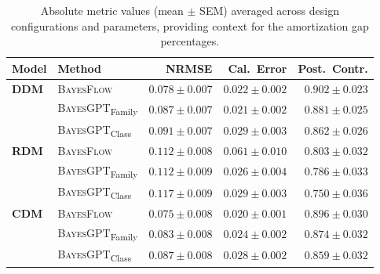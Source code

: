 \begin{table}[ht]
\centering
\small
\caption{Absolute metric values (mean $\pm$ SEM) averaged across design configurations and parameters, providing context for the amortization gap percentages.}
\label{tab:absolute-metrics}
\begin{tabular}{llrrr}
\toprule
\textbf{Model} & \textbf{Method} & NRMSE & Cal.\ Error & Post.\ Contr. \\
\midrule
\textbf{DDM} & \textsc{BayesFlow} & $0.078 \pm 0.007$ & $0.022 \pm 0.002$ & $0.902 \pm 0.023$ \\
 & \textsc{BayesGPT}\textsubscript{Family} & $0.087 \pm 0.007$ & $0.021 \pm 0.002$ & $0.881 \pm 0.025$ \\
 & \textsc{BayesGPT}\textsubscript{Class} & $0.091 \pm 0.007$ & $0.029 \pm 0.003$ & $0.862 \pm 0.026$ \\
\midrule
\textbf{RDM} & \textsc{BayesFlow} & $0.112 \pm 0.008$ & $0.061 \pm 0.010$ & $0.803 \pm 0.032$ \\
 & \textsc{BayesGPT}\textsubscript{Family} & $0.112 \pm 0.009$ & $0.026 \pm 0.004$ & $0.786 \pm 0.033$ \\
 & \textsc{BayesGPT}\textsubscript{Class} & $0.117 \pm 0.009$ & $0.029 \pm 0.003$ & $0.750 \pm 0.036$ \\
\midrule
\textbf{CDM} & \textsc{BayesFlow} & $0.075 \pm 0.008$ & $0.020 \pm 0.001$ & $0.896 \pm 0.030$ \\
 & \textsc{BayesGPT}\textsubscript{Family} & $0.083 \pm 0.008$ & $0.024 \pm 0.002$ & $0.874 \pm 0.032$ \\
 & \textsc{BayesGPT}\textsubscript{Class} & $0.087 \pm 0.008$ & $0.028 \pm 0.002$ & $0.859 \pm 0.032$ \\
\bottomrule
\end{tabular}
\end{table}